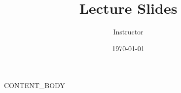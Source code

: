 \documentclass{beamer}
\title{Lecture Slides}
\author{Instructor}
\date{\today}
\begin{document}
\begin{frame}
    \titlepage
\end{frame}

{{CONTENT_BODY}}
\end{document}
